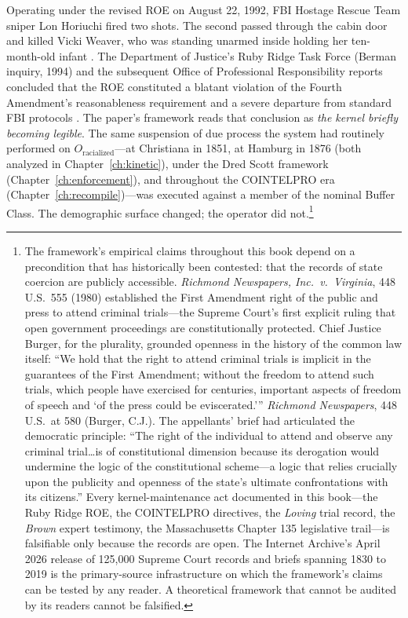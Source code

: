 Operating under the revised ROE on August 22, 1992, FBI Hostage Rescue Team sniper Lon Horiuchi fired two shots. The second passed through the cabin door and killed Vicki Weaver, who was standing unarmed inside holding her ten-month-old infant \cite{dojruby1994}. The Department of Justice's Ruby Ridge Task Force (Berman inquiry, 1994) and the subsequent Office of Professional Responsibility reports concluded that the ROE constituted a blatant violation of the Fourth Amendment's reasonableness requirement and a severe departure from standard FBI protocols \cite{dojruby1994, oprruby2001}. The paper's framework reads that conclusion as \textit{the kernel briefly becoming legible}. The same suspension of due process the system had routinely performed on $O_{\text{racialized}}$---at Christiana in 1851, at Hamburg in 1876 (both analyzed in Chapter~\ref{ch:kinetic}), under the Dred Scott framework (Chapter~\ref{ch:enforcement}), and throughout the COINTELPRO era (Chapter~\ref{ch:recompile})---was executed against a member of the nominal Buffer Class. The demographic surface changed; the operator did not.\footnote{The framework's empirical claims throughout this book depend on a precondition that has historically been contested: that the records of state coercion are publicly accessible. \textit{Richmond Newspapers, Inc.\ v.\ Virginia}, 448 U.S.\ 555 (1980) \cite{richmond_newspapers_1980} established the First Amendment right of the public and press to attend criminal trials---the Supreme Court's first explicit ruling that open government proceedings are constitutionally protected. Chief Justice Burger, for the plurality, grounded openness in the history of the common law itself: ``We hold that the right to attend criminal trials is implicit in the guarantees of the First Amendment; without the freedom to attend such trials, which people have exercised for centuries, important aspects of freedom of speech and `of the press could be eviscerated.''' \textit{Richmond Newspapers}, 448 U.S.\ at 580 (Burger, C.J.). The appellants' brief had articulated the democratic principle: ``The right of the individual to attend and observe any criminal trial\ldots is of constitutional dimension because its derogation would undermine the logic of the constitutional scheme---a logic that relies crucially upon the publicity and openness of the state's ultimate confrontations with its citizens.'' Every kernel-maintenance act documented in this book---the Ruby Ridge ROE, the COINTELPRO directives, the \textit{Loving} trial record, the \textit{Brown} expert testimony, the Massachusetts Chapter 135 legislative trail---is falsifiable only because the records are open. The Internet Archive's April 2026 release of 125,000 Supreme Court records and briefs spanning 1830 to 2019 \cite{ia_scotus_briefs_2026} is the primary-source infrastructure on which the framework's claims can be tested by any reader. A theoretical framework that cannot be audited by its readers cannot be falsified.}

